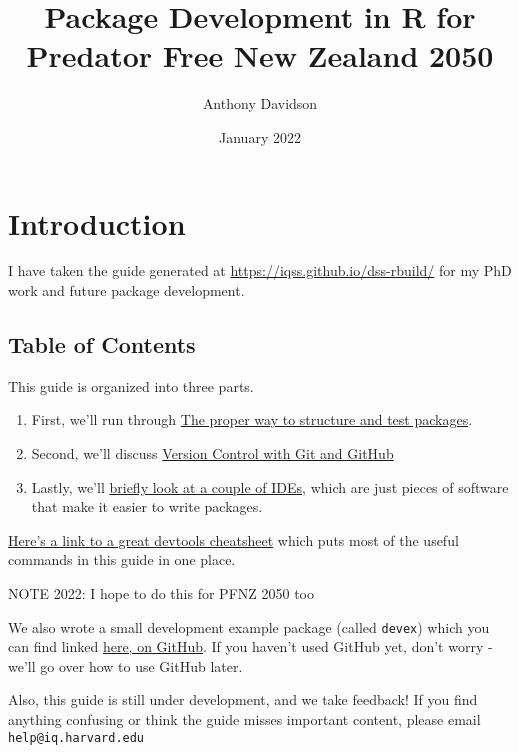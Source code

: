 \documentclass[
]{book}
\title{Package Development in R for Predator Free New Zealand 2050}
\author{Anthony Davidson}
\date{January 2022}
\begin{document}
\maketitle

{
\setcounter{tocdepth}{1}
\tableofcontents
}
\hypertarget{introduction}{%
\chapter*{Introduction}\label{introduction}}

I have taken the guide generated at \url{https://iqss.github.io/dss-rbuild/} for my PhD work and future package development.

\hypertarget{table-of-contents}{%
\section*{Table of Contents}\label{table-of-contents}}

This guide is organized into three parts.

\begin{enumerate}
\def\labelenumi{\arabic{enumi}.}
\item
  First, we'll run through \href{./package-development.html}{The proper way to structure and test packages}.
\item
  Second, we'll discuss \href{./version-control.html}{Version Control with Git and GitHub}
\item
  Lastly, we'll \href{./integrated-development-environments.html}{briefly look at a couple of IDEs}, which are just pieces of software that make it easier to write packages.
\end{enumerate}

\href{https://www.rstudio.com/wp-content/uploads/2015/03/devtools-cheatsheet.pdf}{Here's a link to a great devtools cheatsheet} which puts most of the useful commands in this guide in one place.

NOTE 2022: I hope to do this for PFNZ 2050 too

We also wrote a small development example package (called \texttt{devex}) which you can find linked \href{https://github.com/IQSS/dss-rbuild/tree/master/devex}{here, on GitHub}. If you haven't used GitHub yet, don't worry - we'll go over how to use GitHub later.

Also, this guide is still under development, and we take feedback! If you find anything confusing or think the guide misses important content, please email \texttt{help@iq.harvard.edu}
\end{document}
